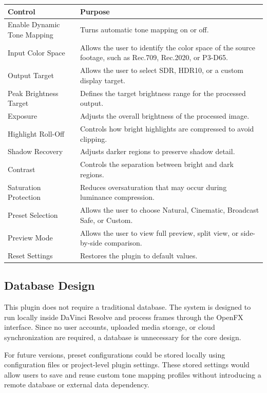 \documentclass[12pt,hyphens]{article}
\begin{document}
\begin{table}[H]
\centering
\renewcommand{\arraystretch}{1.4}
\begin{tabular}{|p{5cm}|p{9cm}|}
\hline
\textbf{Control} & \textbf{Purpose} \\
\hline
Enable Dynamic Tone Mapping & Turns automatic tone mapping on or off. \\
\hline
Input Color Space & Allows the user to identify the color space of the source footage, such as Rec.709, Rec.2020, or P3-D65. \\
\hline
Output Target & Allows the user to select SDR, HDR10, or a custom display target. \\
\hline
Peak Brightness Target & Defines the target brightness range for the processed output. \\
\hline
Exposure & Adjusts the overall brightness of the processed image. \\
\hline
Highlight Roll-Off & Controls how bright highlights are compressed to avoid clipping. \\
\hline
Shadow Recovery & Adjusts darker regions to preserve shadow detail. \\
\hline
Contrast & Controls the separation between bright and dark regions. \\
\hline
Saturation Protection & Reduces oversaturation that may occur during luminance compression. \\
\hline
Preset Selection & Allows the user to choose Natural, Cinematic, Broadcast Safe, or Custom. \\
\hline
Preview Mode & Allows the user to view full preview, split view, or side-by-side comparison. \\
\hline
Reset Settings & Restores the plugin to default values. \\
\hline
\end{tabular}
\end{table}

\subsection{Database Design}
This plugin does not require a traditional database. The system is designed to run locally inside DaVinci Resolve and process frames through the OpenFX interface. Since no user accounts, uploaded media storage, or cloud synchronization are required, a database is unnecessary for the core design.

For future versions, preset configurations could be stored locally using configuration files or project-level plugin settings. These stored settings would allow users to save and reuse custom tone mapping profiles without introducing a remote database or external data dependency.
\end{document}
